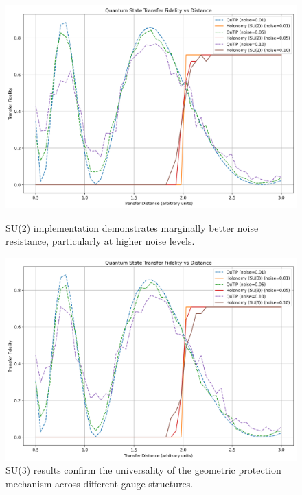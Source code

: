 \documentclass[12pt]{article}
\begin{document}
\begin{figure}[!ht]
\centering
\begin{minipage}{0.48\textwidth}
    \includegraphics[width=\linewidth]{transfer_comparison-su2.png}
    \caption{SU(2) implementation demonstrates marginally better noise resistance, particularly at higher noise levels.}
    \label{fig:comparison-su2}
\end{minipage}
\hfill
\begin{minipage}{0.48\textwidth}
    \includegraphics[width=\linewidth]{transfer_comparison-su3.png}
    \caption{SU(3) results confirm the universality of the geometric protection mechanism across different gauge structures.}
    \label{fig:comparison-su3}
\end{minipage}
\end{figure}
\end{document}
